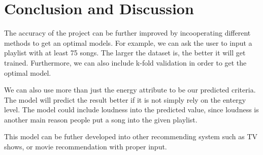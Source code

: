 \documentclass{article}
\begin{document}
\section{Conclusion and Discussion}
The accuracy of the project can be further improved by incooperating different methods to get an optimal models. For example, we can
ask the user to input a playlist with at least 75 songs. The larger the dataset is, the better it will get trained. Furthermore, we
can also include k-fold validation in order to get the optimal model. 

We can also use more than just the energy attribute to be our predicted criteria. The model will predict the result better if it is not
simply rely on the entergy level. The model could include loudness into the predicted value, since loudness is another main reason people
put a song into the given playlist.

This model can be futher developed into other recommending system such as TV shows, or movie recommendation with proper input. 
\end{document}
